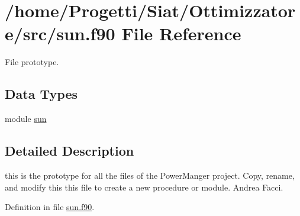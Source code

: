 \hypertarget{sun_8f90}{\section{/home/\-Progetti/\-Siat/\-Ottimizzatore/src/sun.f90 File Reference}
\label{sun_8f90}
}


File prototype.  


\subsection*{Data Types}
\begin{DoxyCompactItemize}
\item 
module \hyperlink{classsun}{sun}
\end{DoxyCompactItemize}


\subsection{Detailed Description}
this is the prototype for all the files of the Power\-Manger project. Copy, rename, and modify this this file to create a new procedure or module.  Andrea Facci. 

Definition in file \hyperlink{sun_8f90_source}{sun.\-f90}.

